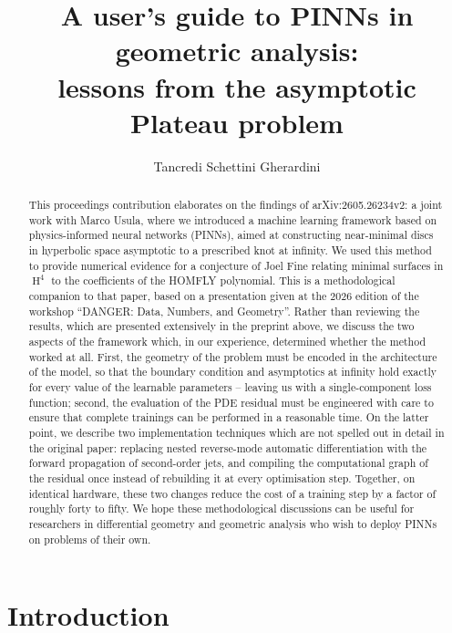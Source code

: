 \documentclass[oneside,british]{amsart}
\title[A user's guide to PINNs in geometric analysis:\\ lessons from the asymptotic Plateau problem]{A user's guide to PINNs in geometric analysis:\\ lessons from the asymptotic Plateau problem}
\author{Tancredi Schettini Gherardini}
\numberwithin{equation}{section}
\numberwithin{figure}{section}
\theoremstyle{plain}
\numberwithin{thm}{section}
\theoremstyle{plain}
\theoremstyle{plain}
\theoremstyle{definition}
\theoremstyle{remark}
\DeclareMathOperator{\HH}{\mathrm{H}}
\begin{document}
\begin{abstract}
This proceedings contribution elaborates on the findings of arXiv:2605.26234v2:
a joint work with Marco Usula, where we introduced a machine learning
framework based on physics-informed neural networks (PINNs), aimed at
constructing near-minimal discs in hyperbolic space asymptotic to a
prescribed knot at infinity. We used this method to provide numerical evidence
for a conjecture of Joel Fine relating minimal surfaces in $\HH^{4}$ to the
coefficients of the HOMFLY polynomial. This is a
methodological companion to that paper, based on a presentation given at 
the 2026 edition of the workshop ``DANGER: Data, Numbers, and Geometry''.
Rather than reviewing the results, which are presented extensively in the preprint 
above, we discuss the two aspects of the framework which, in our experience, 
determined whether the method worked at all. First, the geometry of the problem
must be encoded in the architecture of the model, so that the boundary
condition and asymptotics at infinity hold exactly
for every value of the learnable parameters -- leaving us with a single-component
loss function; second, the evaluation of the PDE residual must be engineered 
with care to ensure that complete trainings can be performed in a reasonable time. 
On the latter point, we describe two implementation techniques which are not spelled
out in detail in the original paper: replacing nested reverse-mode automatic 
differentiation  with the forward propagation of second-order jets, and compiling 
the computational graph of the residual once instead of rebuilding it at
every optimisation step. Together, on identical hardware, these two changes reduce the cost of a training step by a
factor of roughly forty to fifty. We hope these methodological discussions
can be useful for researchers in differential geometry and geometric 
analysis who wish to deploy PINNs on problems of their own.
\end{abstract}

\maketitle

\section{Introduction}
\end{document}
